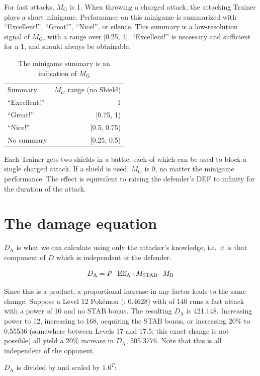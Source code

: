 For fast attacks, $M_\mathrm{G}$ is 1.
When throwing a charged attack, the attacking Trainer plays a short minigame.
Performance on this minigame is summarized with ``Excellent!'', ``Great!'',
``Nice!'', or silence.
This summary is a low-resolution signal of $M_\mathrm{G}$, with a range over [0.25, 1].
``Excellent!'' is necessary and sufficient for a 1, and should always be obtainable.
\begin{table}
\centering
\begin{tabular}{l r}
Summary & $M_G$ range (no Shield) \\
\Midrule
``Excellent!'' & 1 \\
``Great!'' & [0.75, 1) \\
``Nice!'' & [0.5, 0.75) \\
No summary & [0.25, 0.5) \\
\end{tabular}
\caption{The minigame summary is an indication of $M_\mathrm{G}$}
\end{table}
Each Trainer gets two shields in a battle, each of which can be used
 to block a single charged attack.
If a shield is used, $M_\mathrm{G}$ is 0, no matter the minigame performance.
The effect is equivalent to raising the defender's DEF to infinity for the
  duration of the attack.

\section{The damage equation\label{sec:damage}}

$D_\mathrm{A}$ is what we can calculate using only the attacker's knowledge, i.e.\
 it is that component of $D$ which is independent of the defender.

\[ D_\mathrm{A} = P \cdot \mbox{$\text{Eff}_\text{A}$} \cdot M_\mathrm{STAB} \cdot M_\mathrm{B} \]

Since this is a product, a proportional increase in any factor leads to
 the same change.
Suppose a Level 12 Pokémon (\CPM: 0.4628) with  of 140 runs
  a fast attack with a power of 10 and no STAB bonus.
The resulting $D_\mathrm{A}$ is 421.148.
Increasing power to 12,
 increasing  to 168,
 acquiring the STAB bonus,
 or increasing \CPM{} 20\% to 0.55536 (somewhere between Levels 17 and 17.5; this exact change is not possible)
 all yield a 20\% increase in $D_\mathrm{A}$, 505.3776.
Note that this is all independent of the opponent.

$D_\mathrm{A}$ is divided by  and scaled by $1.6^T$:

